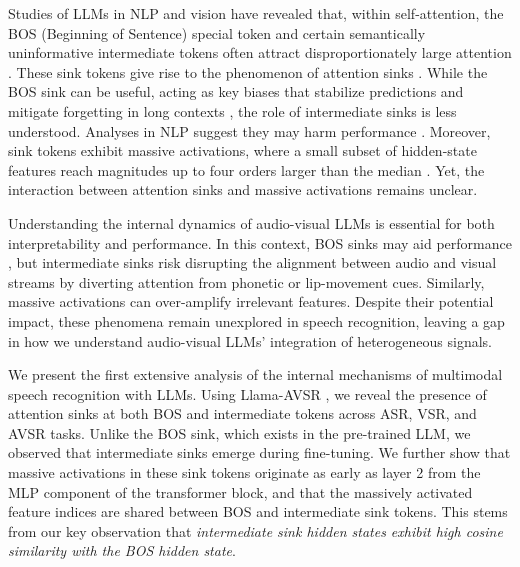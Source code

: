 \documentclass{article}
\begin{document}
Studies of LLMs in NLP and vision have revealed that, within self-attention, the BOS (Beginning of Sentence) special token and certain semantically uninformative intermediate tokens often attract disproportionately large attention \cite{xiao2023streamingllm, gu2024attention, yu2024unveiling, cancedda2024spectral, barbero2025llms, qiu2025gated}. These sink tokens give rise to the phenomenon of attention sinks \cite{xiao2023streamingllm}. While the BOS sink can be useful, acting as key biases that stabilize predictions \cite{gu2024attention} and mitigate forgetting in long contexts \cite{xiao2023streamingllm}, the role of intermediate sinks is less understood. Analyses in NLP suggest they may harm performance \cite{yu2024unveiling}. Moreover, sink tokens exhibit massive activations, where a small subset of hidden-state features reach magnitudes up to four orders larger than the median \cite{sun2024massive, owen2025refined, kaul2024attention}. Yet, the interaction between attention sinks and massive activations remains unclear.




Understanding the internal dynamics of audio-visual LLMs is essential for both interpretability and performance. In this context, BOS sinks may aid performance \cite{xiao2023streamingllm, gu2024attention}, but intermediate sinks risk disrupting the alignment between audio and visual streams by diverting attention from phonetic or lip-movement cues. Similarly, massive activations can over-amplify irrelevant features. Despite their potential impact, these phenomena remain unexplored in speech recognition, leaving a gap in how we understand audio-visual LLMs’ integration of heterogeneous signals.




We present the first extensive analysis of the internal mechanisms of multimodal speech recognition with LLMs. Using Llama-AVSR \cite{cappellazzo2025large}, we reveal the presence of attention sinks at both BOS and intermediate tokens across ASR, VSR, and AVSR tasks. Unlike the BOS sink, which exists in the pre-trained LLM, we observed that intermediate sinks emerge during fine-tuning. We further show that massive activations in these sink tokens originate as early as layer 2 from the MLP component of the transformer block, and that the massively activated feature indices are shared between BOS and intermediate sink tokens. This stems from our key observation that \textit{intermediate sink hidden states exhibit high cosine similarity with the BOS hidden state}.
\end{document}

